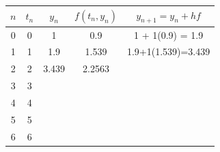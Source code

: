 \documentclass[convert]{standalone}
\begin{document}
\begin{tabular}{|c|c|c|c|c|}
	\hline
	$n$ & $t_n$ & $y_n$ & $f(t_n,y_n)$ & $y_{n+1}=y_n + hf$ \\ \hline
	0   & 0     & 1     & 0.9          & 1 + 1(0.9) = 1.9   \\ \hline
	1   & 1     & 1.9   & 1.539        & 1.9+1(1.539)=3.439 \\ \hline
	2   & 2     & 3.439 & 2.2563       &                    \\ \hline
	3   & 3     &       &              &                    \\ \hline
	4   & 4     &       &              &                    \\ \hline
	5   & 5     &       &              &                    \\ \hline
	6   & 6     &       &              &                    \\ \hline
\end{tabular}
\end{document}
